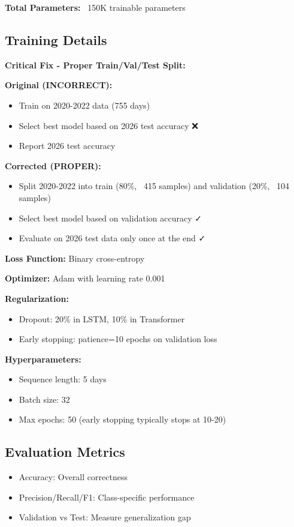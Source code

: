 \documentclass[10pt,twocolumn]{article}
\begin{document}
\textbf{Total Parameters:} ~150K trainable parameters

\subsection{Training Details}

\textbf{Critical Fix - Proper Train/Val/Test Split:}

\textbf{Original (INCORRECT):}
\begin{itemize}
\item Train on 2020-2022 data (755 days)
\item Select best model based on 2026 test accuracy ❌
\item Report 2026 test accuracy
\end{itemize}

\textbf{Corrected (PROPER):}
\begin{itemize}
\item Split 2020-2022 into train (80\%, ~415 samples) and validation (20\%, ~104 samples)
\item Select best model based on validation accuracy ✓
\item Evaluate on 2026 test data only once at the end ✓
\end{itemize}

\textbf{Loss Function:} Binary cross-entropy

\textbf{Optimizer:} Adam with learning rate 0.001

\textbf{Regularization:}
\begin{itemize}
\item Dropout: 20\% in LSTM, 10\% in Transformer
\item Early stopping: patience=10 epochs on validation loss
\end{itemize}

\textbf{Hyperparameters:}
\begin{itemize}
\item Sequence length: 5 days
\item Batch size: 32
\item Max epochs: 50 (early stopping typically stops at 10-20)
\end{itemize}

\subsection{Evaluation Metrics}

\begin{itemize}
\item Accuracy: Overall correctness
\item Precision/Recall/F1: Class-specific performance
\item Validation vs Test: Measure generalization gap
\end{itemize}
\end{document}
